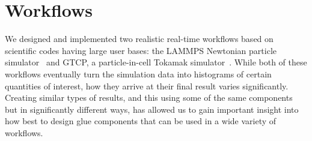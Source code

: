 \documentclass[conference]{IEEEtran}
\begin{document}


\section{Workflows}
\label{s:workflow}

We designed and implemented two realistic real-time workflows based on
scientific codes having large user bases: the LAMMPS Newtonian particle
simulator~\cite{plimpton:1997:lammps} and GTCP, a particle-in-cell Tokamak
simulator~\cite{lin:gtc}. While both of these workflows eventually turn the
simulation data into histograms of certain quantities of interest, how they
arrive at their final result varies significantly. Creating similar types of
results, and this using some of the same components but in significantly
different ways, has allowed us to gain important insight into how best to
design glue components that can be used in a wide variety of workflows.

%
%
\end{document}
